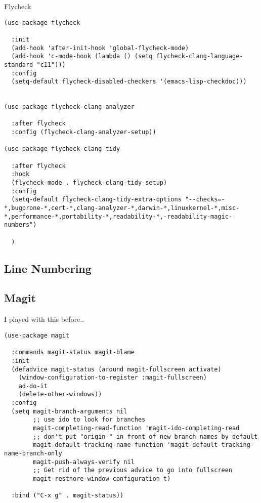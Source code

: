 \documentclass[12pt]{article}
\begin{document}
Flycheck
\begin{verbatim}
(use-package flycheck

  :init
  (add-hook 'after-init-hook 'global-flycheck-mode)
  (add-hook 'c-mode-hook (lambda () (setq flycheck-clang-language-standard "c11")))
  :config
  (setq-default flycheck-disabled-checkers '(emacs-lisp-checkdoc)))


(use-package flycheck-clang-analyzer

  :after flycheck
  :config (flycheck-clang-analyzer-setup))

(use-package flycheck-clang-tidy

  :after flycheck
  :hook
  (flycheck-mode . flycheck-clang-tidy-setup)
  :config
  (setq-default flycheck-clang-tidy-extra-options "--checks=-*,bugprone-*,cert-*,clang-analyzer-*,darwin-*,linuxkernel-*,misc-*,performance-*,portability-*,readability-*,-readability-magic-numbers")

  )
\end{verbatim}

\subsection{Line Numbering}
\label{sec:orgd8c122e}

\subsection{Magit}
\label{sec:org6adca73}

I played with this before..

\begin{verbatim}
(use-package magit

  :commands magit-status magit-blame
  :init
  (defadvice magit-status (around magit-fullscreen activate)
    (window-configuration-to-register :magit-fullscreen)
    ad-do-it
    (delete-other-windows))
  :config
  (setq magit-branch-arguments nil
        ;; use ido to look for branches
        magit-completing-read-function 'magit-ido-completing-read
        ;; don't put "origin-" in front of new branch names by default
        magit-default-tracking-name-function 'magit-default-tracking-name-branch-only
        magit-push-always-verify nil
        ;; Get rid of the previous advice to go into fullscreen
        magit-restnore-window-configuration t)

  :bind ("C-x g" . magit-status))

\end{verbatim}
\end{document}
